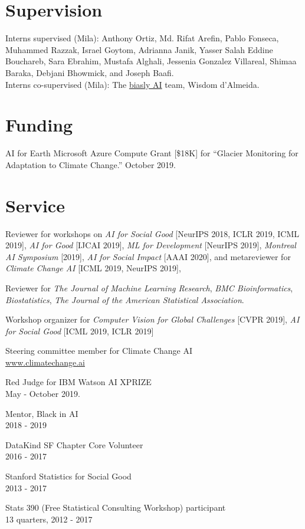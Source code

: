 \documentclass[letterpaper]{article}
\renewenvironment{itemize}{
  \begin{list}{}{
    \setlength{\leftmargin}{1.5em}
  }
}{
  \end{list}
}
\begin{document}
\section*{Supervision}
Interns supervised (Mila): Anthony Ortiz, Md. Rifat Arefin, Pablo Fonseca, Muhammed Razzak, Israel Goytom, Adrianna Janik, Yasser Salah Eddine Bouchareb, Sara Ebrahim, Mustafa Alghali, Jessenia Gonzalez Villareal, Shimaa Baraka, Debjani Bhowmick, and Joseph Baafi. \\
Interns co-supervised (Mila): The \href{https://sites.google.com/view/biaslyai/home}{biasly AI} team, Wisdom d'Almeida.

\section*{Funding}
AI for Earth Microsoft Azure Compute Grant [\$18K] for
``Glacier Monitoring for Adaptation to Climate Change.'' October 2019.

\section*{Service}

\begin{itemize}
\item Reviewer for workshops on \textit{AI for Social Good} [NeurIPS 2018, ICLR 2019, ICML 2019], \textit{AI for Good} [IJCAI 2019], \textit{ML for Development} [NeurIPS 2019], \textit{Montreal AI Symposium} [2019], \textit{AI for Social Impact} [AAAI 2020], and metareviewer for \textit{Climate Change AI} [ICML 2019, NeurIPS 2019],
\item Reviewer for \textit{The Journal of Machine Learning Research}, \textit{BMC Bioinformatics}, \textit{Biostatistics}, \textit{The Journal of the American Statistical Association}.
\item Workshop organizer for \textit{Computer Vision for Global Challenges} [CVPR 2019], \textit{AI for Social Good} [ICML 2019, ICLR 2019]
\item  Steering committee member for Climate Change AI \\ \href{https://www.climatechange.ai}{www.climatechange.ai}
\item Red Judge for IBM Watson AI XPRIZE \\
May - October 2019.
\item Mentor, Black in AI \\
  2018 - 2019
\item DataKind SF Chapter Core Volunteer \\
  2016 - 2017
\item Stanford Statistics for Social Good \\
  2013 - 2017
\item Stats 390 (Free Statistical Consulting Workshop) participant \\
  13 quarters, 2012 - 2017
\end{itemize}
\end{document}
